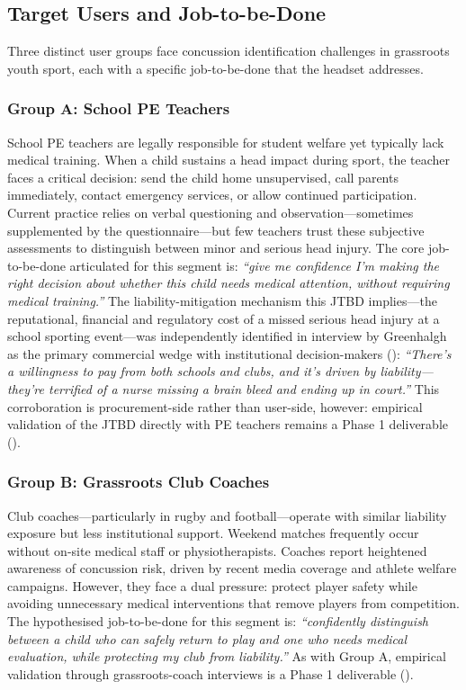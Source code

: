 \subsection{Target Users and Job-to-be-Done}
\label{sec:ent-target-users}

Three distinct user groups face concussion identification challenges in grassroots youth sport, each with a specific job-to-be-done that the headset addresses.

\subsubsection*{Group A: School PE Teachers}

School PE teachers are legally responsible for student welfare yet typically lack medical training. When a child sustains a head impact during sport, the teacher faces a critical decision: send the child home unsupervised, call parents immediately, contact emergency services, or allow continued participation. Current practice relies on verbal questioning and observation---sometimes supplemented by the  questionnaire---but few teachers trust these subjective assessments to distinguish between minor and serious head injury. The core job-to-be-done articulated for this segment is: \textit{``give me confidence I'm making the right decision about whether this child needs medical attention, without requiring medical training.''} The liability-mitigation mechanism this JTBD implies---the reputational, financial and regulatory cost of a missed serious head injury at a school sporting event---was independently identified in interview by Greenhalgh as the primary commercial wedge with institutional decision-makers (): \textit{``There's a willingness to pay from both schools and clubs, and it's driven by liability---they're terrified of a nurse missing a brain bleed and ending up in court.''} This corroboration is procurement-side rather than user-side, however: empirical validation of the JTBD directly with PE teachers remains a Phase 1 deliverable ().

\subsubsection*{Group B: Grassroots Club Coaches}

Club coaches---particularly in rugby and football---operate with similar liability exposure but less institutional support. Weekend matches frequently occur without on-site medical staff or physiotherapists. Coaches report heightened awareness of concussion risk, driven by recent media coverage and athlete welfare campaigns. However, they face a dual pressure: protect player safety while avoiding unnecessary medical interventions that remove players from competition. The hypothesised job-to-be-done for this segment is: \textit{``confidently distinguish between a child who can safely return to play and one who needs medical evaluation, while protecting my club from liability.''} As with Group A, empirical validation through grassroots-coach interviews is a Phase 1 deliverable ().

